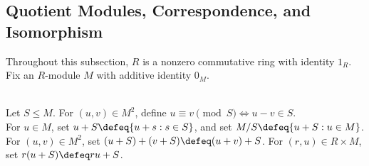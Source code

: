 \subsection{Quotient Modules, Correspondence, and Isomorphism}

Throughout this subsection, $R$ is a nonzero commutative ring with identity $1_R$.\\
Fix an $R$-module $M$ with additive identity $0_M$.

\begin{definition} \label{def:quotient-module} \\
Let $S\leq M$. For $(u,v)\in M^2$, define $u\equiv v\pmod S\Longleftrightarrow u-v\in S$.\\
For $u\in M$, set $u+S\defeq\{u+s:s\in S\}$, and set $M/S\defeq\{u+S:u\in M\}$.\\
For $(u,v)\in M^2$, set $(u+S)+(v+S)\defeq(u+v)+S$. For $(r,u)\in R\times M$, set $r(u+S)\defeq ru+S$.
\end{definition}

